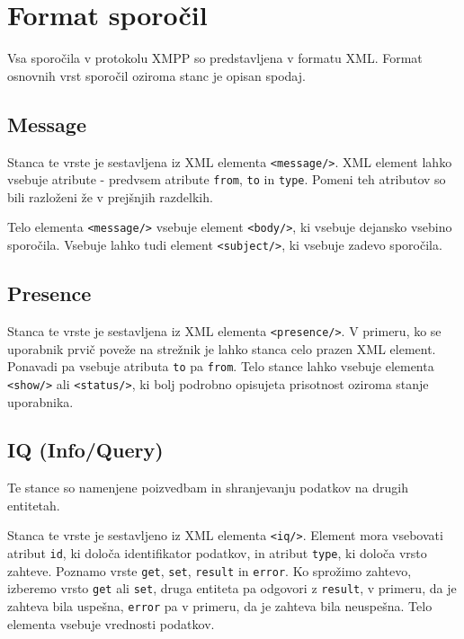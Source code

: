 \documentclass[11pt]{article}
\begin{document}
\section{Format sporočil}
\label{sec:org498424e}

Vsa sporočila v protokolu XMPP so predstavljena v formatu
XML. Format osnovnih vrst sporočil oziroma stanc je opisan spodaj.

\subsection{Message}
\label{sec:org987b816}

Stanca te vrste je sestavljena iz XML elementa \texttt{<message/>}. XML
element lahko vsebuje atribute - predvsem atribute \texttt{from}, \texttt{to} in
\texttt{type}. Pomeni teh atributov so bili razloženi že v prejšnjih
razdelkih.

Telo elementa \texttt{<message/>} vsebuje element \texttt{<body/>}, ki vsebuje
dejansko vsebino sporočila. Vsebuje lahko tudi element \texttt{<subject/>}, ki
vsebuje zadevo sporočila.

\subsection{Presence}
\label{sec:org1f05e94}

Stanca te vrste je sestavljena iz XML elementa \texttt{<presence/>}. V
primeru, ko se uporabnik prvič poveže na strežnik je lahko stanca celo
prazen XML element. Ponavadi pa vsebuje atributa \texttt{to} pa \texttt{from}. Telo
stance lahko vsebuje elementa \texttt{<show/>} ali \texttt{<status/>}, ki bolj
podrobno opisujeta prisotnost oziroma stanje uporabnika.

\subsection{IQ (Info/Query)}
\label{sec:org7c2bd3d}

Te stance so namenjene poizvedbam in shranjevanju podatkov na
drugih entitetah.

Stanca te vrste je sestavljeno iz XML elementa \texttt{<iq/>}. Element mora
vsebovati atribut \texttt{id}, ki določa identifikator podatkov, in atribut
\texttt{type}, ki določa vrsto zahteve. Poznamo vrste \texttt{get}, \texttt{set}, \texttt{result}
in \texttt{error}. Ko sprožimo zahtevo, izberemo vrsto \texttt{get} ali \texttt{set}, druga
entiteta pa odgovori z \texttt{result}, v primeru, da je zahteva bila
uspešna, \texttt{error} pa v primeru, da je zahteva bila neuspešna. Telo
elementa vsebuje vrednosti podatkov.
\end{document}
